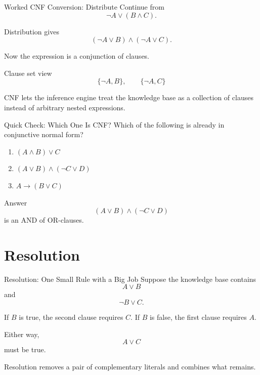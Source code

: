 \documentclass[aspectratio=169,10pt]{beamer}
\begin{document}
\begin{frame}[shrink=8]{Worked CNF Conversion: Distribute}
  Continue from
  \[
    \neg A \lor (B \land C).
  \]

  Distribution gives
  \[
    (\neg A \lor B) \land (\neg A \lor C).
  \]

  Now the expression is a conjunction of clauses.

  \begin{block}{Clause set view}
    \[
      \{\neg A,B\},\qquad \{\neg A,C\}
    \]
  \end{block}

  \begin{keyidea}
    CNF lets the inference engine treat the knowledge base as a collection of clauses instead of arbitrary nested expressions.
  \end{keyidea}
\end{frame}

\begin{frame}[shrink=10]{Quick Check: Which One Is CNF?}
  Which of the following is already in conjunctive normal form?

  \begin{enumerate}
    \item $(A \land B) \lor C$
    \item $(A \lor B) \land (\neg C \lor D)$
    \item $A \rightarrow (B \lor C)$
  \end{enumerate}

  \pause
  \begin{block}{Answer}
    \[
      (A \lor B) \land (\neg C \lor D)
    \]
    is an AND of OR-clauses.
  \end{block}
\end{frame}

\section{Resolution}

\begin{frame}[shrink=10]{Resolution: One Small Rule with a Big Job}
  Suppose the knowledge base contains
  \[
    A \lor B
  \]
  and
  \[
    \neg B \lor C.
  \]

  If $B$ is true, the second clause requires $C$. If $B$ is false, the first clause requires $A$.

  Either way,
  \[
    A \lor C
  \]
  must be true.

  \begin{keyidea}
    Resolution removes a pair of complementary literals and combines what remains.
  \end{keyidea}
\end{frame}
\end{document}

